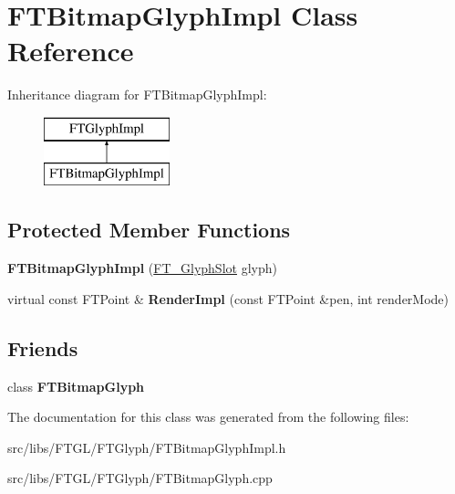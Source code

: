 \hypertarget{class_f_t_bitmap_glyph_impl}{
\section{FTBitmapGlyphImpl Class Reference}
\label{class_f_t_bitmap_glyph_impl}
}
Inheritance diagram for FTBitmapGlyphImpl:\begin{figure}[H]
\begin{center}
\leavevmode
\includegraphics[height=2.000000cm]{class_f_t_bitmap_glyph_impl}
\end{center}
\end{figure}
\subsection*{Protected Member Functions}
\begin{DoxyCompactItemize}
\item 
\hypertarget{class_f_t_bitmap_glyph_impl_a4462585cd1fc2e461ff8c6a0b49c68b3}{
{\bfseries FTBitmapGlyphImpl} (\hyperlink{struct_f_t___glyph_slot_rec__}{FT\_\-GlyphSlot} glyph)}
\label{class_f_t_bitmap_glyph_impl_a4462585cd1fc2e461ff8c6a0b49c68b3}

\item 
\hypertarget{class_f_t_bitmap_glyph_impl_a31a412b09a68489ab2e96ad4524badde}{
virtual const FTPoint \& {\bfseries RenderImpl} (const FTPoint \&pen, int renderMode)}
\label{class_f_t_bitmap_glyph_impl_a31a412b09a68489ab2e96ad4524badde}

\end{DoxyCompactItemize}
\subsection*{Friends}
\begin{DoxyCompactItemize}
\item 
\hypertarget{class_f_t_bitmap_glyph_impl_aa3f0c28a7cfbfa0e896973476f7ed49d}{
class {\bfseries FTBitmapGlyph}}
\label{class_f_t_bitmap_glyph_impl_aa3f0c28a7cfbfa0e896973476f7ed49d}

\end{DoxyCompactItemize}


The documentation for this class was generated from the following files:\begin{DoxyCompactItemize}
\item 
src/libs/FTGL/FTGlyph/FTBitmapGlyphImpl.h\item 
src/libs/FTGL/FTGlyph/FTBitmapGlyph.cpp\end{DoxyCompactItemize}
